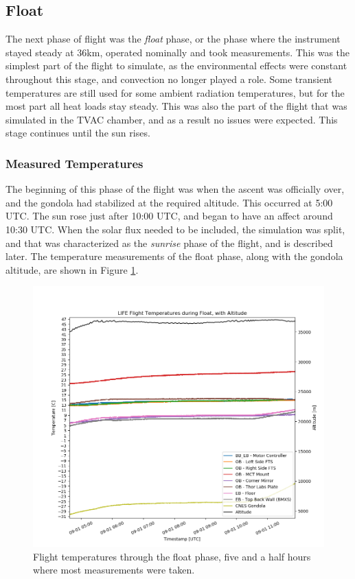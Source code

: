 \subsection{Float}
The next phase of flight was the \textit{float} phase, or the phase where the instrument stayed steady at 36km, operated nominally and took measurements. This was the simplest part of the flight to simulate, as the environmental effects were constant throughout this stage, and convection no longer played a role. Some transient temperatures are still used for some ambient radiation temperatures, but for the most part all heat loads stay steady. This was also the part of the flight that was simulated in the TVAC chamber, and as a result no issues were expected. This stage continues until the sun rises.

\subsubsection{Measured Temperatures}
The beginning of this phase of the flight was when the ascent was officially over, and the gondola had stabilized at the required altitude. This occurred at 5:00 UTC. The sun rose just after 10:00 UTC, and began to have an affect around 10:30 UTC. When the solar flux needed to be included, the simulation was split, and that was characterized as the \textit{sunrise} phase of the flight, and is described later. The temperature measurements of the float phase, along with the gondola altitude, are shown in Figure \ref{fig:float_temps_no_sims}.

\begin{figure}
    \centering
    \includegraphics[width=\textwidth]{chap4_images/float_images/float_no_sim_temps.png}
    \caption{Flight temperatures through the float phase, five and a half hours where most measurements were taken.}
    \label{fig:float_temps_no_sims}
\end{figure}

